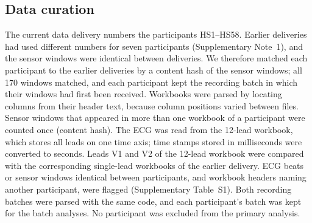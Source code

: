 \documentclass[11pt]{article}
\begin{document}
\subsection*{Data curation}
The current data delivery numbers the participants HS1--HS58. Earlier deliveries had used different numbers for seven participants (Supplementary Note~1), and the sensor windows were identical between deliveries. We therefore matched each participant to the earlier deliveries by a content hash of the sensor windows; all 170 windows matched, and each participant kept the recording batch in which their windows had first been received. Workbooks were parsed by locating columns from their header text, because column positions varied between files. Sensor windows that appeared in more than one workbook of a participant were counted once (content hash). The ECG was read from the 12-lead workbook, which stores all leads on one time axis; time stamps stored in milliseconds were converted to seconds. Leads V1 and V2 of the 12-lead workbook were compared with the corresponding single-lead workbooks of the earlier delivery. ECG beats or sensor windows identical between participants, and workbook headers naming another participant, were flagged (Supplementary Table~S1). Both recording batches were parsed with the same code, and each participant's batch was kept for the batch analyses. No participant was excluded from the primary analysis.
\end{document}
